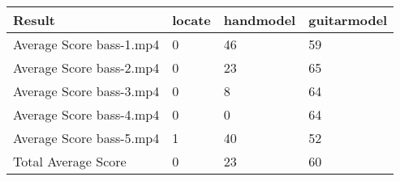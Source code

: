 \begin{tabular}{llll}
\toprule
 Result                   &   locate &   handmodel &   guitarmodel \\
\midrule
 Average Score bass-1.mp4 & 0        & 46          & 59            \\
 Average Score bass-2.mp4 & 0        & 23          & 65            \\
 Average Score bass-3.mp4 & 0        & 8           & 64            \\
 Average Score bass-4.mp4 & 0        & 0           & 64            \\
 Average Score bass-5.mp4 & 1        & 40          & 52            \\
 Total Average Score      & 0        & 23          & 60            \\
\bottomrule
\end{tabular}
